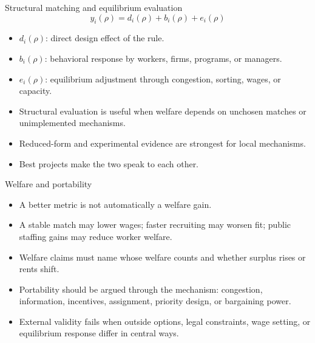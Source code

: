 \documentclass[aspectratio=169,11pt]{beamer}
\begin{document}
\begin{frame}{Structural matching and equilibrium evaluation}
\small
\[
y_i(\rho)=d_i(\rho)+b_i(\rho)+e_i(\rho)
\]
\begin{itemize}
    \item $d_i(\rho)$: direct design effect of the rule.
    \item $b_i(\rho)$: behavioral response by workers, firms, programs, or managers.
    \item $e_i(\rho)$: equilibrium adjustment through congestion, sorting, wages, or capacity.
\end{itemize}
\vspace{0.15cm}
\begin{itemize}
    \item Structural evaluation is useful when welfare depends on unchosen matches or unimplemented mechanisms.
    \item Reduced-form and experimental evidence are strongest for local mechanisms.
    \item Best projects make the two speak to each other.
\end{itemize}
\end{frame}

\begin{frame}{Welfare and portability}
\begin{itemize}
    \item A better metric is not automatically a welfare gain.
    \item A stable match may lower wages; faster recruiting may worsen fit; public staffing gains may reduce worker welfare.
    \item Welfare claims must name whose welfare counts and whether surplus rises or rents shift.
    \item Portability should be argued through the mechanism: congestion, information, incentives, assignment, priority design, or bargaining power.
    \item External validity fails when outside options, legal constraints, wage setting, or equilibrium response differ in central ways.
\end{itemize}
\end{frame}
\end{document}

